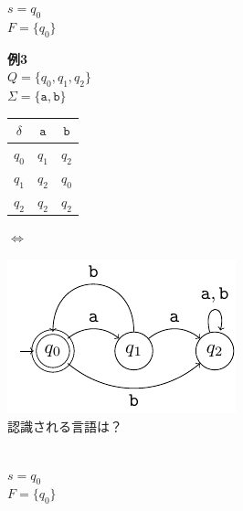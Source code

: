 \documentclass[main]{subfiles}
\begin{document}
\begin{tcolorbox}
$s = q_0$\\
$F = \{q_0\}$

\textbf{例3}\\
$Q = \{q_0, q_1, q_2\}$\\
$\Sigma = \{\mathtt{a,b}\}$\\[-14pt]
\begin{tabular}{c|cc}
$\delta$ & $\mathtt{a}$ & $\mathtt{b}$ \\
\hline
$q_0$ & $q_1$ & $q_2$ \\
$q_1$ & $q_2$ & $q_0$ \\
$q_2$ & $q_2$ & $q_2$ \\
\end{tabular}
\hspace{5mm} $\Leftrightarrow$ 
\begin{minipage}{0.45\textwidth}
  \includegraphics{figures/dfa3.pdf}\\[2mm]
  \small{認識される言語は？}
\end{minipage}\\[-20pt]

$s = q_0$\\
$F = \{q_0\}$
\end{tcolorbox}
\end{document}
